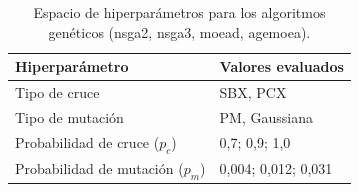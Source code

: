 \begin{table}[H]
\centering
\small
\caption{Espacio de hiperparámetros para los algoritmos genéticos (\acrshort{nsga2}, \acrshort{nsga3}, \acrshort{moead}, \acrshort{agemoea}).}
\label{tab:hp_grid_ga}
\begin{tabular}{ll}
\toprule
Hiperparámetro & Valores evaluados \\
\midrule
Tipo de cruce & SBX, PCX \\
Tipo de mutación & PM, Gaussiana \\
Probabilidad de cruce ($p_c$) & 0,7; 0,9; 1,0 \\
Probabilidad de mutación ($p_m$) & 0,004; 0,012; 0,031 \\
\bottomrule
\end{tabular}
\end{table}
